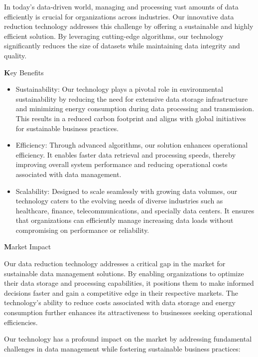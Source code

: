 In today's data-driven world, managing and processing vast amounts of data efficiently is crucial for organizations across industries. Our innovative data reduction technology addresses this challenge by offering a sustainable and highly efficient solution. By leveraging cutting-edge algorithms, our technology significantly reduces the size of datasets while maintaining data integrity and quality.

{\textbf Key Benefits}

\begin{itemize}
\item Sustainability: Our technology plays a pivotal role in environmental sustainability by reducing the need for extensive data storage infrastructure and minimizing energy consumption during data processing and transmission. This results in a reduced carbon footprint and aligns with global initiatives for sustainable business practices.

\item Efficiency: Through advanced algorithms, our solution enhances operational efficiency. It enables faster data retrieval and processing speeds, thereby improving overall system performance and reducing operational costs associated with data management.

\item Scalability: Designed to scale seamlessly with growing data volumes, our technology caters to the evolving needs of diverse industries such as healthcare, finance, telecommunications, and specially data centers. It ensures that organizations can efficiently manage increasing data loads without compromising on performance or reliability.

\end{itemize}

{\textbf Market Impact}

Our data reduction technology addresses a critical gap in the market for sustainable data management solutions. By enabling organizations to optimize their data storage and processing capabilities, it positions them to make informed decisions faster and gain a competitive edge in their respective markets. The technology's ability to reduce costs associated with data storage and energy consumption further enhances its attractiveness to businesses seeking operational efficiencies.

Our  technology has a profound impact on the market by addressing fundamental challenges in data management while fostering sustainable business practices:

